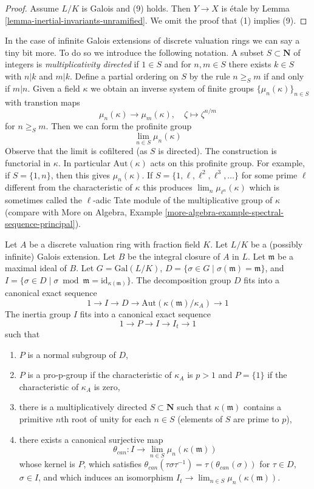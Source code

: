 \begin{proof}
\medskip\noindent
Assume $L/K$ is Galois and (9) holds. Then $Y \to X$ is \'etale
by Lemma \ref{lemma-inertial-invariants-unramified}.
We omit the proof that (1) implies (9).
\end{proof}

\noindent
In the case of infinite Galois extensions of discrete valuation rings
we can say a tiny bit more. To do so we introduce the following notation.
A subset $S \subset \mathbf{N}$ of integers is {\it multiplicativity directed}
if $1 \in S$ and for $n, m \in S$ there exists $k \in S$ with
$n | k$ and $m | k$. Define a partial ordering on $S$ by the rule
$n \geq_S m$ if and only if $m | n$. Given a field $\kappa$ we obtain
an inverse system of finite groups $\{\mu_n(\kappa)\}_{n \in S}$
with transtion maps
$$
\mu_n(\kappa) \longrightarrow \mu_m(\kappa),\quad
\zeta \longmapsto \zeta^{n/m}
$$
for $n \geq_S m$. Then we can form the profinite group
$$
\lim_{n \in S} \mu_n(\kappa)
$$
Observe that the limit is cofiltered (as $S$ is directed).
The construction is functorial in $\kappa$. In particular
$\text{Aut}(\kappa)$ acts on this profinite group.
For example, if $S = \{1, n\}$, then this gives $\mu_n(\kappa)$.
If $S = \{1, \ell, \ell^2, \ell^3, \ldots\}$ for some prime
$\ell$ different from the characteristic of $\kappa$ this produces
$\lim_n \mu_{\ell^n}(\kappa)$
which is sometimes called the $\ell$-adic Tate module of the multiplicative
group of $\kappa$ (compare with
More on Algebra, Example
\ref{more-algebra-example-spectral-sequence-principal}).

\begin{lemma}
\label{lemma-structure-decomposition}
Let $A$ be a discrete valuation ring with fraction field $K$.
Let $L/K$ be a (possibly infinite) Galois extension.
Let $B$ be the integral closure of $A$ in $L$.
Let $\mathfrak m$ be a maximal ideal of $B$.
Let $G = \text{Gal}(L/K)$,
$D = \{\sigma \in G \mid \sigma(\mathfrak m) = \mathfrak m\}$, and
$I = \{\sigma \in D \mid \sigma \bmod \mathfrak m =
\text{id}_{\kappa(\mathfrak m)}\}$.
The decomposition group $D$ fits into a canonical exact sequence
$$
1 \to I \to D \to \text{Aut}(\kappa(\mathfrak m)/\kappa_A) \to 1
$$
The inertia group $I$ fits into a canonical exact sequence
$$
1 \to P \to I \to I_t \to 1
$$
such that
\begin{enumerate}
\item $P$ is a normal subgroup of $D$,
\item $P$ is a pro-p-group if the characteristic of
$\kappa_A$ is $p > 1$ and $P = \{1\}$ if the characteristic of $\kappa_A$
is zero,
\item there is a multiplicatively directed $S \subset \mathbf{N}$
such that $\kappa(\mathfrak m)$ contains a primitive $n$th root of unity
for each $n \in S$ (elements of $S$ are prime to $p$),
\item there exists a canonical surjective map
$$
\theta_{can} : I \to \lim_{n \in S} \mu_n(\kappa(\mathfrak m))
$$
whose kernel is $P$, which satisfies
$\theta_{can}(\tau \sigma \tau^{-1}) = \tau(\theta_{can}(\sigma))$
for $\tau \in D$, $\sigma \in I$, and which induces an isomorphism
$I_t \to \lim_{n \in S} \mu_n(\kappa(\mathfrak m))$.
\end{enumerate}
\end{lemma}

